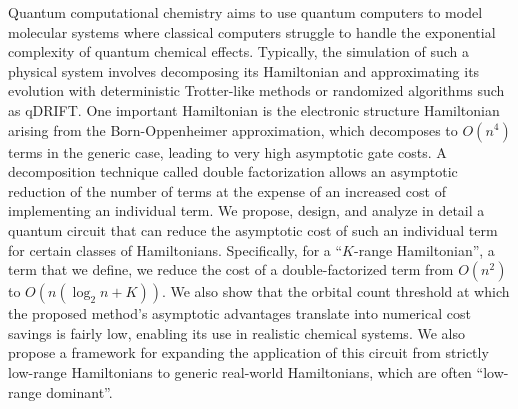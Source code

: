 %
%

Quantum computational chemistry aims to use quantum computers to model molecular systems where classical computers struggle to handle the exponential complexity of quantum chemical effects. Typically, the simulation of such a physical system involves decomposing its Hamiltonian and approximating its evolution with deterministic Trotter-like methods or randomized algorithms such as qDRIFT. One important Hamiltonian is the electronic structure Hamiltonian arising from the Born-Oppenheimer approximation, which decomposes to $O(n^4)$ terms in the generic case, leading to very high asymptotic gate costs. A decomposition technique called double factorization allows an asymptotic reduction of the number of terms at the expense of an increased cost of implementing an individual term. We propose, design, and analyze in detail a quantum circuit that can reduce the asymptotic cost of such an individual term for certain classes of Hamiltonians. Specifically, for a ``$K$-range Hamiltonian'', a term that we define, we reduce the cost of a double-factorized term from $O(n^2)$ to $O(n(\log_2{n} + K))$. We also show that the orbital count threshold at which the proposed method's asymptotic advantages translate into numerical cost savings is fairly low, enabling its use in realistic chemical systems. We also propose a framework for expanding the application of this circuit from strictly low-range Hamiltonians to generic real-world Hamiltonians, which are often ``low-range dominant''.